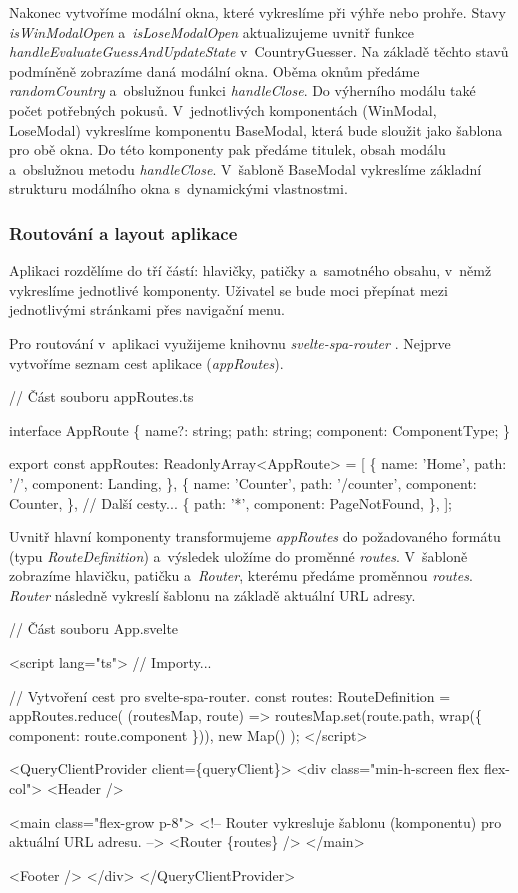 Nakonec vytvoříme modální okna, které vykreslíme při výhře nebo prohře. Stavy \emph{isWinModalOpen} a~\emph{isLoseModalOpen} aktualizujeme uvnitř funkce \emph{handleEvaluateGuessAndUpdateState} v~CountryGuesser. 
Na základě těchto stavů podmíněně zobrazíme daná modální okna. Oběma oknům předáme \emph{randomCountry} a~obslužnou funkci \emph{handleClose}. Do výherního modálu také počet potřebných pokusů. 
V~jednotlivých komponentách (WinModal, LoseModal) vykreslíme komponentu BaseModal, která bude sloužit jako šablona pro obě okna. Do této komponenty pak předáme titulek, obsah modálu a~obslužnou metodu \emph{handleClose}. 
V~šabloně BaseModal vykreslíme základní strukturu modálního okna s~dynamickými vlastnostmi.

\subsubsection*{Routování a layout aplikace}

Aplikaci rozdělíme do tří částí: hlavičky, patičky a~samotného obsahu, v~němž vykreslíme jednotlivé komponenty. Uživatel se bude moci přepínat mezi jednotlivými stránkami přes navigační menu. 

Pro routování v~aplikaci využijeme knihovnu \emph{svelte-spa-router} \cite{sveltesparouterlib}. Nejprve vytvoříme seznam cest aplikace (\emph{appRoutes}).

\begin{prog}
// Část souboru appRoutes.ts

interface AppRoute \{
  name?: string;
  path: string;
  component: ComponentType;
\}

export const appRoutes: ReadonlyArray<AppRoute> = [
  \{
    name: 'Home',
    path: '/',
    component: Landing,
  \},
  \{
    name: 'Counter',
    path: '/counter',
    component: Counter,
  \},
  // Další cesty...
  \{
    path: '*',
    component: PageNotFound,
  \},
];
\end{prog}

Uvnitř hlavní komponenty transformujeme \emph{appRoutes} do požadovaného formátu (typu \emph{RouteDefinition}) a~výsledek uložíme do proměnné \emph{routes}. 
V~šabloně zobrazíme hlavičku, patičku a~\emph{Router}, kterému předáme proměnnou \emph{routes}. 
\emph{Router} následně vykreslí šablonu na základě aktuální URL adresy.

\begin{prog}
// Část souboru App.svelte

<script lang="ts">
  // Importy...

  // Vytvoření cest pro svelte-spa-router.
  const routes: RouteDefinition = appRoutes.reduce(
    (routesMap, route) => routesMap.set(route.path, wrap(\{
      component: route.component
    \})),
    new Map()
  );
</script>

<QueryClientProvider client=\{queryClient\}>
  <div class="min-h-screen flex flex-col">
    <Header />

    <main class="flex-grow p-8">
      <!-- Router vykresluje šablonu (komponentu) pro aktuální URL adresu. -->
      <Router \{routes\} />
    </main>

    <Footer />
  </div>
</QueryClientProvider>
\end{prog}

